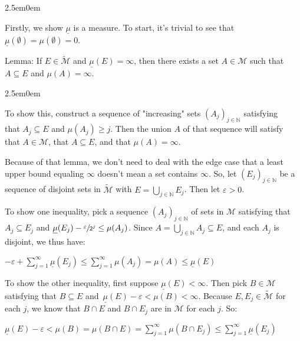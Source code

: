 \documentclass{book}
\newcommand{\exTwoP}{%
   \color{RedViolet}%
   \fontsize{13}{15}\selectfont%
}
\newcommand{\exPPP}{%
   \color{VioletRed}%
   \fontsize{12}{14}\selectfont%
}
\newenvironment{myIndent}{%
   \begin{adjustwidth}{2.5em}{0em}%
}{%
   \end{adjustwidth}%
}
\newcommand{\retTwo}{\hfill\bigbreak}
\begin{document}
\begin{enumerate}
   \begin{myIndent}\exTwoP
      Firstly, we show $\underline{\mu}$ is a measure. To start, it's trivial to see that $\underline{\mu}(\emptyset) = \mu(\emptyset) = 0$.\retTwo

      Lemma: If $E \in \widetilde{\mathcal{M}}$ and $\underline{\mu}(E) = \infty$, then there exists a set $A \in \mathcal{M}$ such that $A \subseteq E$ and $\mu(A) = \infty$. 
      \begin{myIndent}\exPPP
         To show this, construct a sequence of "increasing" sets $(A_j)_{j \in \mathbb{N}}$ satisfying\\ that $A_j \subseteq E$ and $\mu(A_j) \geq j$. Then the union $A$ of that sequence will satisfy\\ that $A \in \mathcal{M}$, that $A \subseteq E$, and that $\mu(A) = \infty$.\retTwo
      \end{myIndent}

      Because of that lemma, we don't need to deal with the edge case that a least\\ upper bound equaling $\infty$ doesn't mean a set contains $\infty$. So, let $(E_j)_{j \in \mathbb{N}}$ be a sequence of disjoint sets in $\widetilde{\mathcal{M}}$ with $E = \bigcup\limits_{j \in \mathbb{N}} E_j$. Then let $\varepsilon > 0$.\retTwo

      To show one inequality, pick a sequence $(A_j)_{j \in \mathbb{N}}$ of sets in $\mathcal{M}$ satisfying that $A_j \subseteq E_j$ and $\underline{\mu}(E_j) - \sfrac{\varepsilon}{2^j} \leq \mu(A_j)$. Since $A = \bigcup\limits_{j \in \mathbb{N}}A_j \subseteq E$, and each $A_j$ is\\ [-10pt] disjoint, we thus have:

      {\centering $-\varepsilon + \sum\limits_{j=1}^\infty \underline{\mu}(E_j) \leq \sum\limits_{j=1}^\infty \mu(A_j) = \mu(A) \leq \underline{\mu}(E)$\retTwo\par}

		To show the other inequality, first suppose $\underline{\mu}(E) < \infty$. Then pick $B \in \mathcal{M}$\\ [-2pt] satisfying that $B \subseteq E$ and\ $\underline{\mu}(E) - \varepsilon < \mu(B) < \infty$. Because $E, E_j \in \widetilde{\mathcal{M}}$ for each $j$, we know that $B \cap E$ and $B \cap E_j$ are in $\mathcal{M}$ for each $j$. So:

      {\centering $\underline{\mu}(E) - \varepsilon < \mu(B) = \mu(B \cap E) = \sum\limits_{j=1}^\infty \mu(B \cap E_j) \leq \sum\limits_{j=1}^\infty\underline{\mu}(E_j)$\newpage\par}


\end{myIndent}
\end{enumerate}
\end{document}
